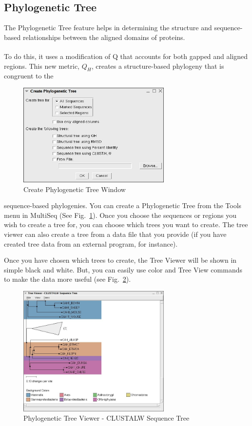 

\subsection{Phylogenetic Tree}
The Phylogenetic Tree feature helps in determining the
structure and sequence-based relationships between the aligned domains
of proteins.\\ ~\\ To do this, it uses a modification of Q that accounts
for both gapped and aligned regions.  This new metric, \begin{math} Q_H
\end{math}, creates a structure-based phylogeny that is congruent to the
\begin{figure}[here]
 \centerline{\includegraphics [width=3in]{./pictures/ptree1.jpg}}
 \caption{Create Phylogenetic Tree Window}
\label{fig:ptree1}
\end{figure}
sequence-based phylogenies.  You can create a Phylogenetic Tree from the
\textsf{Tools} menu in MultiSeq (See Fig.~\ref{fig:ptree1}).  Once you
choose the sequences or regions you wish to create a tree for, you can
choose which trees you want to create.  The tree viewer can also create
a tree from a data file that you provide (if you have created tree data
from an external program, for instance).

Once you have chosen which trees to create, the Tree Viewer will be
shown in simple black and white.  But, you can easily use color and Tree
View commands to make the data more useful (see Fig.~\ref{fig:ptreeView}).  
\begin{figure}[here]
 \centerline{\includegraphics [width=3in]{./pictures/ptreeView.jpg}}
 \caption{Phylogenetic Tree Viewer - CLUSTALW Sequence Tree}
\label{fig:ptreeView}
\end{figure}

